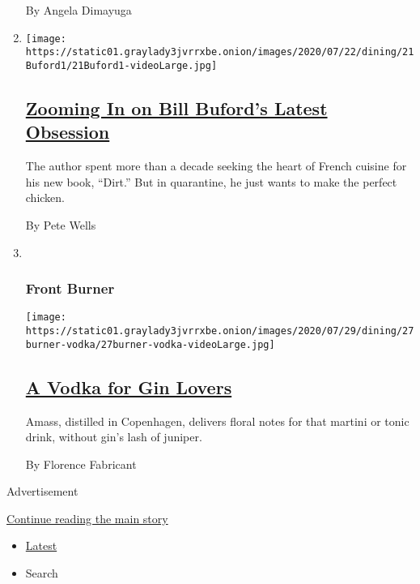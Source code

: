 \begin{enumerate}
  By Angela Dimayuga
\item
  \texttt{[image: https://static01.graylady3jvrrxbe.onion/images/2020/07/22/dining/21Buford1/21Buford1-videoLarge.jpg]}

  \hypertarget{zooming-in-on-bill-bufords-latest-obsession}{%
  \subsection{\texorpdfstring{\href{/2020/07/21/dining/bill-buford-dirt-book-chicken-recipe.html}{Zooming
  In on Bill Buford's Latest
  Obsession}}{Zooming In on Bill Buford's Latest Obsession}}\label{zooming-in-on-bill-bufords-latest-obsession}}

  The author spent more than a decade seeking the heart of French
  cuisine for his new book, ``Dirt.'' But in quarantine, he just wants
  to make the perfect chicken.

  By Pete Wells
\item ~
  \hypertarget{front-burner}{%
  \subsubsection{Front Burner}\label{front-burner}}

  \texttt{[image: https://static01.graylady3jvrrxbe.onion/images/2020/07/29/dining/27burner-vodka/27burner-vodka-videoLarge.jpg]}

  \hypertarget{a-vodka-for-gin-lovers}{%
  \subsection{\texorpdfstring{\href{/2020/07/27/dining/amass-vodka.html}{A
  Vodka for Gin
  Lovers}}{A Vodka for Gin Lovers}}\label{a-vodka-for-gin-lovers}}

  Amass, distilled in Copenhagen, delivers floral notes for that martini
  or tonic drink, without gin's lash of juniper.

  By Florence Fabricant
\end{enumerate}

Advertisement

\protect\hyperlink{after-mid1}{Continue reading the main story}

\begin{itemize}
\tightlist
\item
  \protect\hyperlink{stream-panel}{Latest}
\item
  Search
\end{itemize}


